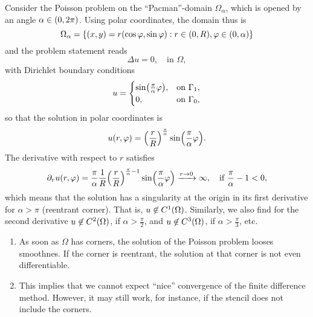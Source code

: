 \begin{example}
	Consider the Poisson problem on the ``Pacman''-domain \(\Omega_\alpha\), which is opened by an angle \(\alpha \in \parentheses*{0, 2\pi}\).
	Using polar coordinates, the domain thus is
	\[
		\Omega_\alpha = \braces*{\parentheses*{x, y} = r\parentheses*{\cos\varphi, \sin\varphi} : r \in \parentheses*{0, R}, \varphi \in \parentheses*{0, \alpha}}
	\]
	and the problem statement reads
	\[
		\Delta u = 0, \quad \text{in }\Omega,
	\]
	with Dirichlet boundary conditions
	\[
		u = \begin{cases}
			\sin\parentheses*{\frac{\pi}{\alpha}\varphi}, & \text{on }\Gamma_1,\\
			0, & \text{on }\Gamma_0,
		\end{cases}
	\]
	so that the solution in polar coordinates is
	\[
		u\parentheses*{r, \varphi} = \parentheses*{\frac{r}{R}}^{\frac{\pi}{\alpha}}\sin\parentheses*{\frac{\pi}{\alpha}\varphi}.
	\]
	The derivative with respect to \(r\) satisfies
	\[
		\partial_r u\parentheses*{r, \varphi} = \frac{\pi}{\alpha}\frac{1}{R}\parentheses*{\frac{r}{R}}^{\frac{\pi}{\alpha} - 1}\sin\parentheses*{\frac{\pi}{\alpha}\varphi} \xrightarrow{r \to 0} \infty, \quad \text{if }\frac{\pi}{\alpha} - 1 < 0,
	\]
	which means that the solution has a singularity at the origin in its first derivative for \(\alpha > \pi\) (reentrant corner).
	That is, \(u \not\in C^1\parentheses*{\Omega}\).
	Similarly, we also find for the second derivative \(u \not\in C^2\parentheses*{\Omega}\), if \(\alpha > \frac{\pi}{2}\), and \(u \not\in C^3\parentheses*{\Omega}\), if \(\alpha > \frac{\pi}{3}\), etc.
\end{example}

\begin{remark}
	\begin{enumerate}
		\item As soon as \(\Omega\) has corners, the solution of the Poisson problem looses smoothnes.
		If the corner is reentrant, the solution at that corner is not even differentiable.
		\item This implies that we cannot expect ``nice'' convergence of the finite difference method.
		However, it may still work, for instance, if the stencil does not include the corners.
	\end{enumerate}
\end{remark}
